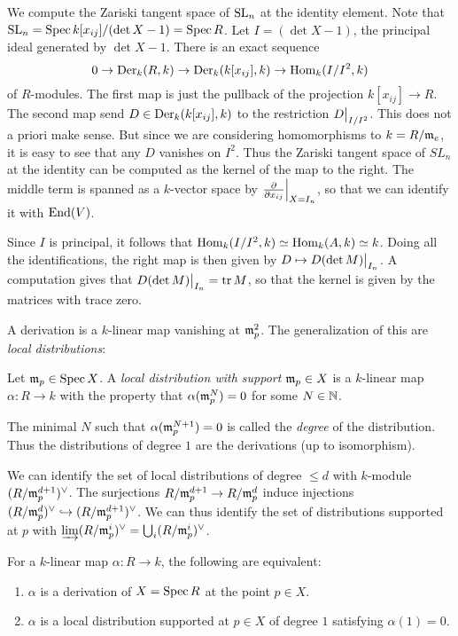 \documentclass[11pt, english]{article}
\begin{document}
\begin{example}
We compute the Zariski tangent space of $\operatorname{SL}_n$ at the identity element. Note that $\operatorname{SL}_n=\operatorname{Spec} k[x_{ij}]/(\det X-1)=\operatorname{Spec} R$. Let $I=(\det X-1)$, the principal ideal generated by $\det X-1$. There is an exact sequence
$$
0 \to \operatorname{Der}_k(R,k) \to \operatorname{Der}_k(k[x_{ij}],k) \to \operatorname{Hom}_k(I/I^2,k)
$$
of $R$-modules. The first map is just the pullback of the projection $k[x_{ij}] \to R$. The second map send $D \in \operatorname{Der}_k(k[x_{ij}],k)$ to the restriction $\restr{D}{I/I^2}$. This does not a priori make sense. But since we are considering homomorphisms to $k=R/\mathfrak{m}_e$, it is easy to see that any $D$ vanishes on $I^2$. Thus the Zariski tangent space of $SL_n$ at the identity can be computed as the kernel of the map to the right. The middle term is spanned as a $k$-vector space by $\restr{\dd{}{x_{ij}}}{X=I_n}$, so that we can identify it with $\operatorname{End}(V)$.

Since $I$ is principal, it follows that $\operatorname{Hom}_k(I/I^2,k) \simeq \operatorname{Hom}_k(A,k) \simeq k$. Doing all the identifications, the right map is then given by $D \mapsto \restr{D(\det M)}{I_n}$. A computation gives that $\restr{D(\det M)}{I_n}=\tr M $, so that the kernel is given by the matrices with trace zero.
\end{example}

A derivation is a $k$-linear map vanishing at $\mathfrak{m}_p^2$. The generalization of this are \emph{local distributions}:

\begin{defi}
Let $\mathfrak{m}_p \in \operatorname{Spec} X$. A \emph{local distribution with support $\mathfrak{m}_p \in X$} is a $k$-linear map $\alpha:R \to k$ with the property that $\alpha(\mathfrak{m}_p^N)=0$ for some $N \in \mathbb{N}$.

The minimal $N$ such that $\alpha(\mathfrak{m}_p^{N+1})=0$ is called the \emph{degree} of the distribution. Thus the distributions of degree $1$ are the derivations (up to isomorphism).
\end{defi}

We can identify the set of local distributions of degree $\leq d$ with $k$-module $(R/\mathfrak{m}_p^{d+1})^\vee$. The surjections $R/\mathfrak{m}_p^{d+1} \to R/\mathfrak{m}_p^{d}$ induce injections $(R/\mathfrak{m}_p^d)^\vee \hookrightarrow (R/\mathfrak{m}_p^{d+1})^\vee$. We can thus identify the set of distributions supported at $p$ with $\varinjlim (R/\mathfrak{m}_p^i)^\vee = \bigcup_i (R/\mathfrak{m}_p^i)^\vee$.

\begin{lemma}
For a $k$-linear map $\alpha:R \to k$, the following are equivalent:
\begin{enumerate}
\item $\alpha$ is a derivation of $X=\operatorname{Spec} R$ at the point $p \in X$.
\item $\alpha$ is a local distribution supported at $p \in X$ of degree $1$ satisfying $\alpha(1)=0$.
\end{enumerate}
\end{lemma}
\end{document}
